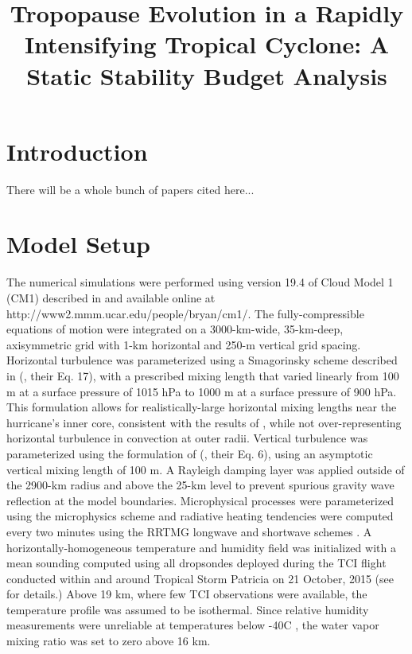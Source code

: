 \documentclass{ametsoc}
\title{Tropopause Evolution in a Rapidly Intensifying Tropical Cyclone: A Static Stability Budget Analysis}
\affiliation{University at Albany, State University of New York,
Albany, NY}
\begin{document}
\maketitle


%

 \section{Introduction}

There will be a whole bunch of papers cited here...

 \section{Model Setup}

The numerical simulations were performed using version 19.4 of Cloud Model 1 (CM1) described in \cite{BryanRotunno2009} and available online at http://www2.mmm.ucar.edu/people/bryan/cm1/.
The fully-compressible equations of motion were integrated on a 3000-km-wide, 35-km-deep, axisymmetric grid with 1-km horizontal and 250-m vertical grid spacing.
Horizontal turbulence was parameterized using a Smagorinsky scheme described in \citeauthor{BryanRotunno2009} (\citeyear{BryanRotunno2009}, their Eq. 17), with a prescribed mixing length that varied linearly from 100 m at a surface pressure of 1015 hPa to 1000 m at a surface pressure of 900 hPa.
This formulation allows for realistically-large horizontal mixing lengths near the hurricane's inner core, consistent with the results of \cite{Bryan2012}, while not over-representing horizontal turbulence in convection at outer radii.
Vertical turbulence was parameterized using the formulation of \citeauthor{MarkowskiBryan2016} (\citeyear{MarkowskiBryan2016}, their Eq. 6), using an asymptotic vertical mixing length of 100 m.
A Rayleigh damping layer was applied outside of the 2900-km radius and above the 25-km level to prevent spurious gravity wave reflection at the model boundaries.
Microphysical processes were parameterized using the \cite{Thompson} microphysics scheme and radiative heating tendencies were computed every two minutes using the RRTMG longwave and shortwave schemes \citep{Iacono}.
A horizontally-homogeneous temperature and humidity field was initialized with a mean sounding computed using all dropsondes deployed during the TCI flight conducted within and around Tropical Storm Patricia on 21 October, 2015 (see \citeauthor{DoyleTCI} \citeyear{DoyleTCI} for details.)
Above 19 km, where few TCI observations were available, the temperature profile was assumed to be isothermal.
Since relative humidity measurements were unreliable at temperatures below -40\textdegree C \citep{BellTCI}, the water vapor mixing ratio was set to zero above 16 km.
\end{document}
